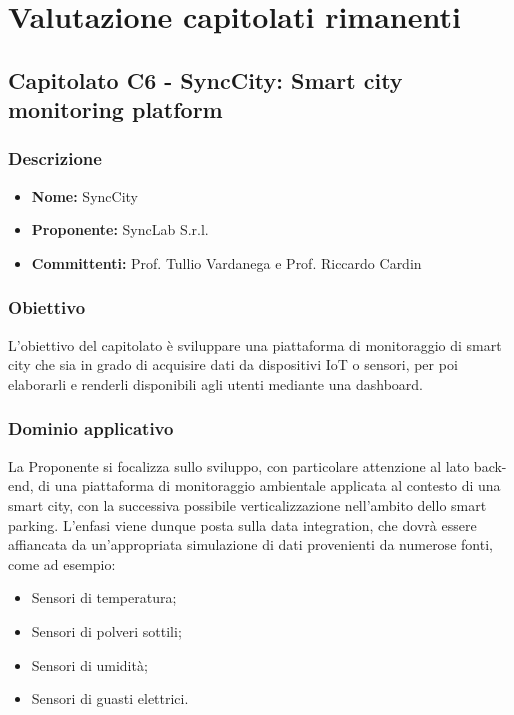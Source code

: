 \section{Valutazione capitolati rimanenti}

\subsection{Capitolato C6 - SyncCity: Smart city monitoring platform}

\subsubsection{Descrizione}
\begin{itemize}
  \item \textbf{Nome:} SyncCity
  \item \textbf{Proponente:} SyncLab S.r.l.
  \item \textbf{Committenti:} Prof. Tullio Vardanega e Prof. Riccardo Cardin
\end{itemize}

\subsubsection{Obiettivo}
L'obiettivo del capitolato è sviluppare una piattaforma di monitoraggio di smart city che sia in grado di acquisire dati da dispositivi IoT o sensori, per poi elaborarli e renderli disponibili agli utenti mediante una dashboard.

\subsubsection{Dominio applicativo}
La Proponente si focalizza sullo sviluppo, con particolare attenzione al lato back-end, di una piattaforma di monitoraggio ambientale applicata al contesto di una smart city, con la successiva possibile verticalizzazione nell'ambito dello smart parking. L'enfasi viene dunque posta sulla data integration, che dovrà essere affiancata da un'appropriata simulazione di dati provenienti da numerose fonti, come ad esempio:
\begin{itemize}
  \item Sensori di temperatura;
  \item Sensori di polveri sottili;
  \item Sensori di umidità;
  \item Sensori di guasti elettrici.
\end{itemize}


